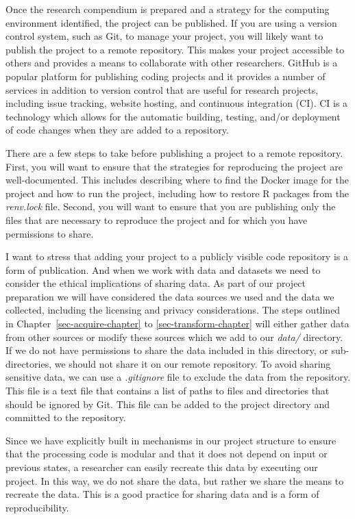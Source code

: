 \documentclass[
  letterpaper,
  krantz1]{latex/krantz-mod}
\theoremstyle{definition}
\theoremstyle{definition}
\theoremstyle{remark}
\begin{document}
Once the research compendium is prepared and a strategy for the
computing environment identified, the project can be published. If you
are using a version control system, such
as Git, to manage your project, you will likely want to publish the
project to a remote repository. This makes your project accessible to
others and provides a means to collaborate with other researchers.
GitHub is a popular platform for publishing coding projects and it
provides a number of services in addition to version control that are
useful for research projects, including issue tracking, website hosting,
and continuous integration (CI). CI is a technology which allows for the
automatic building, testing, and/or deployment of code changes when they
are added to a repository.

There are a few steps to take before publishing a project to a remote
repository. First, you will want to ensure that the strategies for
reproducing the project are well-documented. This includes describing
where to find the Docker image for the project and how to run the
project, including how to restore R packages from the \emph{renv.lock}
file. Second, you will want to ensure that you are publishing only the
files that are necessary to reproduce the project and for which you have
permissions to share.

I want to stress that adding your project to a publicly visible code
repository is a form of publication. And when we work with data and
datasets we need to consider the ethical implications of sharing data.
As part of our project preparation we will have considered the data
sources we used and the data we collected, including the licensing and
privacy considerations. The steps outlined in
Chapter~\ref{sec-acquire-chapter} to \ref{sec-transform-chapter} will
either gather data from other sources or modify these sources which we
add to our \emph{data/} directory. If we do not have permissions to
share the data included in this directory, or sub-directories, we should
not share it on our remote repository. To avoid sharing sensitive data,
we can use a \emph{.gitignore} file to exclude the data from the
repository. This file is a text file that contains a list of paths to
files and directories that should be ignored by Git. This file can be
added to the project directory and committed to the repository.

Since we have explicitly built in mechanisms in our project structure to
ensure that the processing code is modular and that it does not depend
on input or previous states, a researcher can easily recreate this data
by executing our project. In this way, we do not share the data, but
rather we share the means to recreate the data. This is a good practice
for sharing data and is a form of reproducibility.
\end{document}
